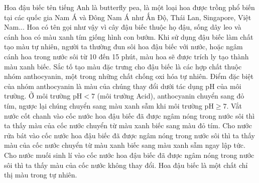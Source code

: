 \documentclass[12pt,a4paper]{article}
\begin{document}
\begin{ex}
Hoa đậu biếc tên tiếng Anh là butterfly pea, là một loại hoa được trồng phổ biến tại các quốc gia Nam Á và Đông Nam Á như Ấn Độ, Thái Lan, Singapore, Việt Nam... Hoa có tên gọi như vậy vì cây đậu biếc thuộc họ đậu, sống dây leo và cánh hoa có màu xanh tím giống hình con bướm. Khi sử dụng đậu biếc làm chất tạo màu tự nhiên, người ta thường đun sôi hoa đậu biếc với nước, hoặc ngâm cánh hoa trong nước sôi từ 10 đến 15 phút, màu hoa sẽ được trích ly tạo thành màu xanh biếc. Sắc tố tạo màu đặc trưng cho đậu biếc là các hợp chất thuộc nhóm anthocyanin, một trong những chất chống oxi hóa tự nhiên. Điểm đặc biệt của nhóm anthocyanin là màu của chúng thay đổi dưới tác dụng pH của môi trường. Ở môi trường $\text{pH} < 7$ (môi trường Acid), anthocyanin chuyển sang đỏ tím, ngược lại chúng chuyển sang màu xanh sẫm khi môi trường $\text{pH} \ge 7$.
\choiceTF
{\True Vắt nước cốt chanh vào cốc nước hoa đậu biếc đã được ngâm nóng trong nước sôi thì ta thấy màu của cốc nước chuyển từ màu xanh biếc sang màu đỏ tím.}
{\True Cho nước rửa bát vào cốc nước hoa đậu biếc đã được ngâm nóng trong nước sôi thì ta thấy màu của cốc nước chuyển từ màu xanh biếc sang màu xanh sẫm ngay lập tức.}
{\True Cho nước muối sinh lí vào cốc nước hoa đậu biếc đã được ngâm nóng trong nước sôi thì ta thấy màu của cốc nước không thay đổi.}
{\True Hoa đậu biếc là một chất chỉ thị màu trong tự nhiên.}
\end{ex}
\end{document}
